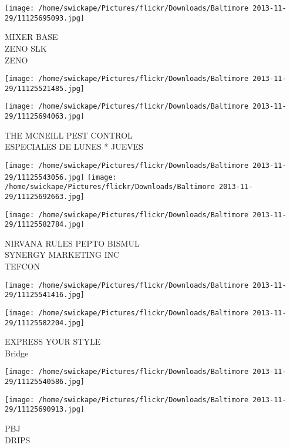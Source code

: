 \documentclass[10pt,letterpaper]{article}
\begin{document}
\texttt{[image: /home/swickape/Pictures/flickr/Downloads/Baltimore 2013-11-29/11125695093.jpg]}

MIXER BASE\\
ZENO SLK\\
ZENO\\
\pagebreak

\texttt{[image: /home/swickape/Pictures/flickr/Downloads/Baltimore 2013-11-29/11125521485.jpg]}

\vspace{0.25in}
\texttt{[image: /home/swickape/Pictures/flickr/Downloads/Baltimore 2013-11-29/11125694063.jpg]}

THE MCNEILL PEST CONTROL\\
ESPECIALES DE LUNES * JUEVES\\
\pagebreak

\texttt{[image: /home/swickape/Pictures/flickr/Downloads/Baltimore 2013-11-29/11125543056.jpg]}
\texttt{[image: /home/swickape/Pictures/flickr/Downloads/Baltimore 2013-11-29/11125692663.jpg]}

\vspace{0.25in}
\texttt{[image: /home/swickape/Pictures/flickr/Downloads/Baltimore 2013-11-29/11125582784.jpg]}

NIRVANA RULES PEPTO BISMUL\\
SYNERGY MARKETING INC\\
TEFCON\\
\pagebreak

\texttt{[image: /home/swickape/Pictures/flickr/Downloads/Baltimore 2013-11-29/11125541416.jpg]}

\vspace{0.25in}
\texttt{[image: /home/swickape/Pictures/flickr/Downloads/Baltimore 2013-11-29/11125582204.jpg]}

EXPRESS YOUR STYLE\\
Bridge\\
\pagebreak

\texttt{[image: /home/swickape/Pictures/flickr/Downloads/Baltimore 2013-11-29/11125540586.jpg]}

\vspace{0.25in}
\texttt{[image: /home/swickape/Pictures/flickr/Downloads/Baltimore 2013-11-29/11125690913.jpg]}

PBJ\\
DRIPS\\
\pagebreak
\end{document}
